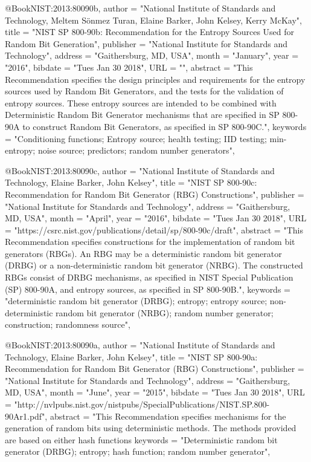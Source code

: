@Book{NIST:2013:80090b,
  author =       "{National Institute of Standards and Technology}, {Meltem Sönmez Turan},  {Elaine Barker}, {John Kelsey}, {Kerry McKay}",
  title =        "{NIST SP 800-90b}: Recommendation for the Entropy Sources Used for Random Bit Generation",
  publisher =    "National Institute for Standards and Technology",
  address =      "Gaithersburg, MD, USA",
  month =        "January",
  year =         "2016",
  bibdate =      "Tues Jan 30 2018",
  URL =          "",
  abstract =     "This Recommendation specifies the design principles and requirements for the entropy sources used by Random Bit Generators, and the tests for the validation of entropy sources. These entropy sources are intended to be combined with Deterministic Random Bit Generator mechanisms that are specified in SP 800-90A to construct Random Bit Generators, as specified in SP 800-90C.",
  keywords =     "Conditioning functions; Entropy source; health testing; IID testing; min-entropy; noise source; predictors; random number generators",
}

@Book{NIST:2013:80090c,
  author =       "{National Institute of Standards and Technology}, {Elaine Barker}, {John Kelsey}",
  title =        "{NIST SP 800-90c}: Recommendation for Random Bit Generator (RBG) Constructions",
  publisher =    "National Institute for Standards and Technology",
  address =      "Gaithersburg, MD, USA",
  month =        "April",
  year =         "2016",
  bibdate =      "Tues Jan 30 2018",
  URL =          "https://csrc.nist.gov/publications/detail/sp/800-90c/draft",
  abstract =     "This Recommendation specifies constructions for the implementation of random bit generators (RBGs). An RBG may be a deterministic random bit generator (DRBG) or a non-deterministic random bit generator (NRBG). The constructed RBGs consist of DRBG mechanisms, as specified in NIST Special Publication (SP) 800-90A, and entropy sources, as specified in SP 800-90B.",
  keywords =     "deterministic random bit generator (DRBG); entropy; entropy source; non-deterministic random bit generator (NRBG); random number generator; construction; randomness source",
}

@Book{NIST:2013:80090a,
  author =       "{National Institute of Standards and Technology}, {Elaine Barker}, {John Kelsey}",
  title =        "{NIST SP 800-90a}: Recommendation for Random Bit Generator (RBG) Constructions",
  publisher =    "National Institute for Standards and Technology",
  address =      "Gaithersburg, MD, USA",
  month =        "June",
  year =         "2015",
  bibdate =      "Tues Jan 30 2018",
  URL =          "http://nvlpubs.nist.gov/nistpubs/SpecialPublications/NIST.SP.800-90Ar1.pdf",
  abstract =     "This Recommendation specifies mechanisms for the generation of random bits using deterministic methods. The methods provided are based on either hash functions 
  keywords =     "Deterministic random bit generator (DRBG); entropy; hash function; random number generator",
}

